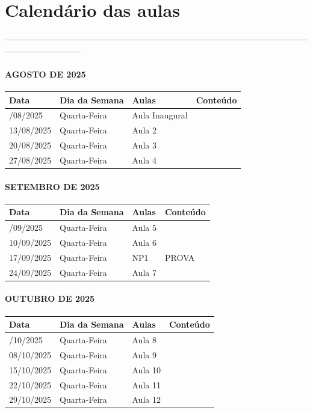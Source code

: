 \documentclass[
]{book}
\begin{document}
\section{Calendário das aulas}\label{calenduxe1rio-das-aulas}

---------------------------------------------------------------------------------------------------------------------------------------

\paragraph{AGOSTO DE 2025}\label{agosto-de-2025}

\begin{longtable}[]{@{}llll@{}}
\toprule\noalign{}
Data & Dia da Semana & Aulas & Conteúdo \\
\midrule\noalign{}
\endhead
\bottomrule\noalign{}
\endlastfoot
06/08/2025 & Quarta-Feira & Aula Inaugural & \\
13/08/2025 & Quarta-Feira & Aula 2 & \\
20/08/2025 & Quarta-Feira & Aula 3 & \\
27/08/2025 & Quarta-Feira & Aula 4 & \\
\end{longtable}

\paragraph{SETEMBRO DE 2025}\label{setembro-de-2025}

\begin{longtable}[]{@{}llll@{}}
\toprule\noalign{}
Data & Dia da Semana & Aulas & Conteúdo \\
\midrule\noalign{}
\endhead
\bottomrule\noalign{}
\endlastfoot
03/09/2025 & Quarta-Feira & Aula 5 & \\
10/09/2025 & Quarta-Feira & Aula 6 & \\
17/09/2025 & Quarta-Feira & NP1 & PROVA \\
24/09/2025 & Quarta-Feira & Aula 7 & \\
\end{longtable}

\paragraph{OUTUBRO DE 2025}\label{outubro-de-2025}

\begin{longtable}[]{@{}llll@{}}
\toprule\noalign{}
Data & Dia da Semana & Aulas & Conteúdo \\
\midrule\noalign{}
\endhead
\bottomrule\noalign{}
\endlastfoot
01/10/2025 & Quarta-Feira & Aula 8 & \\
08/10/2025 & Quarta-Feira & Aula 9 & \\
15/10/2025 & Quarta-Feira & Aula 10 & \\
22/10/2025 & Quarta-Feira & Aula 11 & \\
29/10/2025 & Quarta-Feira & Aula 12 & \\
\end{longtable}
\end{document}
